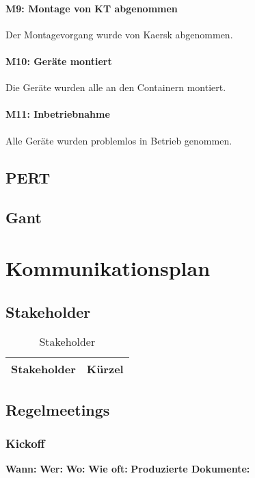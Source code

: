 \paragraph{M9: Montage von KT abgenommen} Der Montagevorgang wurde von Kaersk abgenommen.
\paragraph{M10: Geräte montiert} Die Geräte wurden alle an den Containern montiert.
\paragraph{M11: Inbetriebnahme} Alle Geräte wurden problemlos in Betrieb genommen.




\subsection{PERT} %

\subsection{Gant} %

\section{Kommunikationsplan}
\subsection{Stakeholder}
\begin{table}[H]
    \renewcommand{\arraystretch}{1.1}
    \begin{center}
        \begin{tabular}{l|l}
            \textbf{Stakeholder} & \textbf{Kürzel}\\\hline
            
            
            
            
        \end{tabular}
    \end{center}
    \caption{Stakeholder}
\end{table}
\subsection{Regelmeetings}
 
\subsubsection{Kickoff}
\textbf{Wann:} 
\textbf{Wer:}
\textbf{Wo:}
\textbf{Wie oft:}
\textbf{Produzierte Dokumente:}


